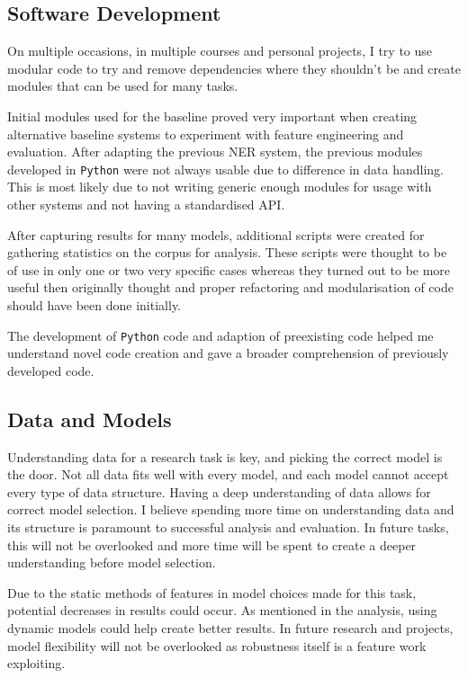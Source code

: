 \subsection{Software Development}

On multiple occasions, in multiple courses and personal projects, I try to use modular code to try and remove dependencies where they shouldn't be and create modules that can be used for many tasks. 

Initial modules used for the baseline proved very important when creating alternative baseline systems to experiment with feature engineering and evaluation. After adapting the previous NER system, the previous modules developed in \texttt{Python} were not always usable due to difference in data handling. This is most likely due to not writing generic enough modules for usage with other systems and not having a standardised API. 

After capturing results for many models, additional scripts were created for gathering statistics on the corpus for analysis. These scripts were thought to be of use in only one or two very specific cases whereas they turned out to be more useful then originally thought and proper refactoring and modularisation of code should have been done initially. 

The development of \texttt{Python} code and adaption of preexisting code helped me understand novel code creation and gave a broader comprehension of previously developed code. 

\subsection{Data and Models}

Understanding data for a research task is key, and picking the correct model is the door. Not all data fits well with every model, and each model cannot accept every type of data structure. Having a deep understanding of data allows for correct model selection. I believe spending more time on understanding data and its structure is paramount to successful analysis and evaluation. In future tasks, this will not be overlooked and more time will be spent to create a deeper understanding before model selection. 

Due to the static methods of features in model choices made for this task, potential decreases in results could occur. As mentioned in the analysis, using dynamic models could help create better results. In future research and projects, model flexibility will not be overlooked as robustness itself is a feature work exploiting.

